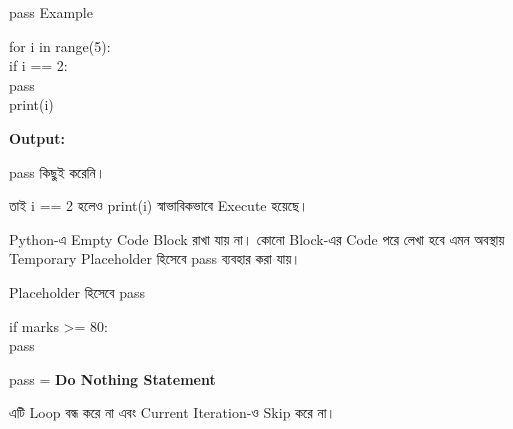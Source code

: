 \begin{codeoutputbox}{\textenglish{\ttfamily pass} Example}

\noindent
\begin{minipage}[t]{0.53\linewidth}
\codeheading

\begin{english}
\ttfamily
for i in range(5):\\
\hspace*{4mm}if i == 2:\\
\hspace*{8mm}pass\\
\hspace*{4mm}print(i)
\end{english}

\end{minipage}
\hfill
\begin{minipage}[t]{0.43\linewidth}
\outputheading

\textbf{Output:}

\begin{center}
\textenglish{    }
\end{center}

\textenglish{\ttfamily pass}
কিছুই করেনি।

তাই
\textenglish{\ttfamily i == 2}
হলেও
\textenglish{\ttfamily print(i)}
স্বাভাবিকভাবে Execute হয়েছে।

\end{minipage}

\end{codeoutputbox}



Python-এ Empty Code Block রাখা যায় না। কোনো Block-এর Code পরে লেখা হবে
এমন অবস্থায় Temporary Placeholder হিসেবে
\textenglish{\ttfamily pass}
ব্যবহার করা যায়।

\begin{codeoutputbox}{Placeholder হিসেবে \textenglish{\ttfamily pass}}

\noindent
\begin{minipage}[t]{0.50\linewidth}
\codeheading

\begin{english}
\ttfamily
if marks >= 80:\\
\hspace*{4mm}pass
\end{english}

\end{minipage}
\hfill
\begin{minipage}[t]{0.46\linewidth}
\outputheading

\begin{center}
\textenglish{\ttfamily pass}
=
\textbf{Do Nothing Statement}
\end{center}

এটি Loop বন্ধ করে না এবং Current Iteration-ও Skip করে না।

\end{minipage}

\end{codeoutputbox}

